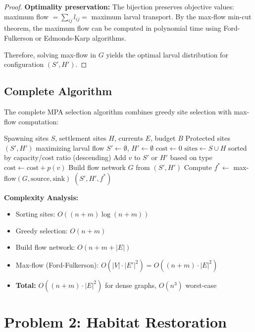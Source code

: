 \documentclass[sigconf,nonacm]{acmart}
\begin{document}
\begin{proof}
\textbf{Optimality preservation:} The bijection preserves objective values: maximum flow $= \sum_{ij} l_{ij} =$ maximum larval transport. By the max-flow min-cut theorem, the maximum flow can be computed in polynomial time using Ford-Fulkerson or Edmonds-Karp algorithms.

Therefore, solving max-flow in $G$ yields the optimal larval distribution for configuration $(S', H')$.
\end{proof}

\subsection{Complete Algorithm}

The complete MPA selection algorithm combines greedy site selection with max-flow computation:

\begin{algorithm}[H]
\caption{Greedy MPA Site Selection}
\begin{algorithmic}[1]
\Require Spawning sites $S$, settlement sites $H$, currents $E$, budget $B$
\Ensure Protected sites $(S', H')$ maximizing larval flow
\State $S' \gets \emptyset$, $H' \gets \emptyset$
\State $\text{cost} \gets 0$
\State $\text{sites} \gets S \cup H$ sorted by capacity/cost ratio (descending)
        \State Add $v$ to $S'$ or $H'$ based on type
        \State $\text{cost} \gets \text{cost} + p(v)$
    \EndIf
\EndFor
\State Build flow network $G$ from $(S', H')$
\State Compute $f^* \gets$ max-flow$(G, \text{source}, \text{sink})$
\State \Return $(S', H', f^*)$
\end{algorithmic}
\end{algorithm}

\textbf{Complexity Analysis:}
\begin{itemize}
    \item Sorting sites: $O((n+m) \log(n+m))$
    \item Greedy selection: $O(n+m)$
    \item Build flow network: $O(n+m+|E|)$
    \item Max-flow (Ford-Fulkerson): $O(|V| \cdot |E'|^2) = O((n+m) \cdot |E|^2)$
    \item \textbf{Total:} $O((n+m) \cdot |E|^2)$ for dense graphs, $O(n^3)$ worst-case
\end{itemize}

\section{Problem 2: Habitat Restoration}
\end{document}
